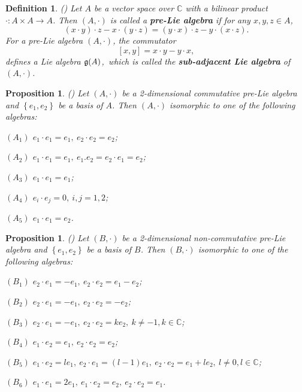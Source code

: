 \documentclass[12pt, reqno]{amsart}
\theoremstyle{plain}
\newtheorem{proposition}[theorem]{Proposition}
\newtheorem{definition}[theorem]{Definition}
\begin{document}
\begin{definition} \rm{(\cite{Cayley})}
 Let $A$ be a vector space over
$\mathbb{C}$ with a bilinear product $\cdot:A\times A\rightarrow A$. Then $(A,\cdot)$ is called
a {\bf pre-Lie algebra} if for any $x,y,z\in A$,
\begin{equation}
(x\cdot y)\cdot z-x\cdot (y\cdot z)=(y\cdot x)\cdot z-y\cdot (x\cdot z).
\end{equation}
For a pre-Lie algebra $(A,\cdot)$, the commutator
\begin{equation}\label{commutator}
[x,y]=x\cdot y-y\cdot x,
\end{equation}
defines a Lie algebra ${\frak g}(A)$,~which is called the
{\bf sub-adjacent Lie algebra} of $(A,\cdot)$.
\end{definition}


\begin{proposition}\label{commutative pre-Lie algebra}\rm{(\cite{Burde, Bai-Meng})}
 Let $\left(A, \cdot\right)$ be a 2-dimensional commutative pre-Lie algebra and $\left\{e_{1}, e_{2}\right\}$ be a basis of $A$. Then $(A,\cdot)$ isomorphic to  one of the
following algebras:

$(A_1)$ $e_1\cdot e_1=e_1,~e_2\cdot e_2=e_2$;

$(A_2)$ $e_1\cdot e_1=e_1,~e_1.e_2=e_2\cdot e_1=e_2$;

$(A_3)$ $e_1\cdot e_1=e_1$;

$(A_4)$ $e_i\cdot e_j=0,~i,j=1,2$;

$(A_5)$ $e_1\cdot e_1=e_2$.
\end{proposition}

\begin{proposition}\label{NON commutative pre-Lie algebra}\rm{(\cite{Burde, Bai-Meng})}
Let $\left(B, \cdot\right)$ be a 2-dimensional non-commutative pre-Lie algebra and $\left\{e_{1}, e_{2}\right\}$ be a basis of $B$. Then $(B,\cdot)$ isomorphic to  one of the
following algebras:

$(B_1)$ $e_2\cdot e_1=-e_1,~e_2\cdot e_2=e_1-e_2$;


$(B_2)$ $e_2\cdot e_1=-e_1,~e_2\cdot e_2=-e_2$;

$(B_3)$ $e_2\cdot e_1=-e_1,~e_2\cdot e_2=ke_2,~k\neq-1, k\in \mathbb{C}$;

$(B_4)$ $e_1\cdot e_2=e_1,~e_2\cdot e_2=e_2$;

$(B_5)$ $e_1\cdot e_2=le_1,~e_2\cdot e_1=(l-1)e_1,~e_2\cdot e_2=e_1+le_2,~l\neq0, l\in \mathbb{C}$;

$(B_6)$ $e_1\cdot e_1=2e_1,~e_1\cdot e_2=e_2,~e_2\cdot e_2=e_1$.
\end{proposition}
\end{document}
